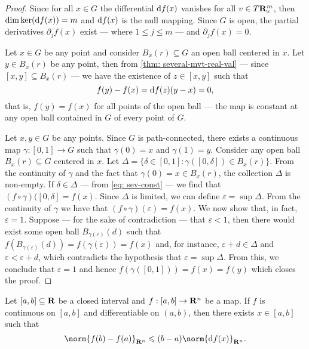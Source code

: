 \begin{proof}
  Since for all \(x \in G\) the differential \(\mathrm{d} f(x)\) vanishes for all \(v
  \in T\mathbf{R}^m_x\), then \(\dim \ker(\mathrm{d} f(x)) = m\) and \(\mathrm{d} f(x)\) is the
  null mapping. Since \(G\) is open, the partial derivatives \(\partial_j f(x)\)
  exist --- where \(1 \leq j \leq m\) --- and \(\partial_j f(x) = 0\).

  Let \(x \in G\) be any point and consider \(B_x(r) \subseteq G\) an open ball
  centered in \(x\). Let \(y \in B_x(r)\) be any point, then from \cref{thm:
  several-mvt-real-val} --- since \([x, y] \subseteq B_x(r)\) --- we have the
  existence of \(z \in [x, y]\) such that
  \begin{equation}\label{eq: sev-const}
    f(y) - f(x) = \mathrm{d} f(z)(y - x) = 0,
  \end{equation}
  that is, \(f(y) = f(x)\) for all points of the open ball --- the map is
  constant at any open ball contained in \(G\) of every point of \(G\).

  Let \(x, y \in G\) be any points. Since \(G\) is path-connected, there exists
  a continuous map \(\gamma: [0, 1] \to G\) such that \(\gamma(0) = x\) and
  \(\gamma(1) = y\). Consider any open ball \(B_x(r) \subseteq G\) centered in
  \(x\). Let \(\Delta = \{\delta \in [0, 1] : \gamma([0, \delta]) \in
  B_x(r)\}\). From the continuity of \(\gamma\) and the fact that \(\gamma(0) =
  x \in B_x(r)\), the collection \(\Delta\) is non-empty. If \(\delta \in
  \Delta\) --- from \cref{eq: sev-const} --- we find that \((f \circ \gamma)([0,
  \delta] = f(x)\). Since \(\Delta\) is limited, we can define \(\varepsilon =
  \sup \Delta\). From the continuity of \(\gamma\) we have that \((f \circ
  \gamma)(\varepsilon) = f(x)\). We now show that, in fact, \(\varepsilon = 1\).
  Suppose --- for the sake of contradiction --- that \(\varepsilon < 1\), then
  there would exist some open ball \(B_{\gamma(\varepsilon)}(d)\) such that
  \(f(B_{\gamma(\varepsilon)}(d)) = f(\gamma(\varepsilon)) = f(x)\) and, for
  instance, \(\varepsilon + d \in \Delta\) and \(\varepsilon < \varepsilon +
  d\), which contradicts the hypothesis that \(\varepsilon = \sup \Delta\). From
  this, we conclude that \(\varepsilon = 1\) and hence \(f(\gamma([0, 1])) = f(x)
  = f(y)\) which closes the proof.
\end{proof}

\begin{lemma}\label{lem: mvt-sev-real-dom}
  Let \([a, b] \subseteq \mathbf{R}\) be a closed interval and \(f: [a, b] \to \mathbf{R}^n\) be
  a map. If \(f\) is continuous on \([a, b]\) and differentiable on \((a, b)\),
  then there exists \(x \in [a, b]\) such that
  \[
    \norm{f(b) - f(a)}_{\R^n} \leq (b - a) \norm{\diff f(x)}_{\R^n}.
  \]
\end{lemma}

